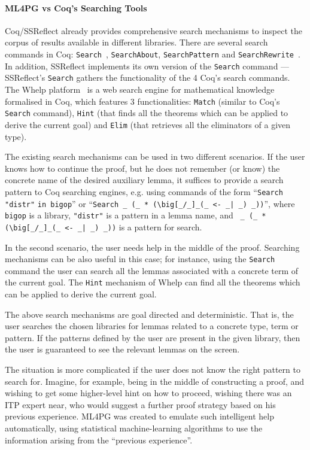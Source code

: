 \paragraph{ML4PG vs Coq's Searching Tools} Coq/SSReflect already provides comprehensive search mechanisms to inspect the corpus of results available in different libraries.
There are several search commands in Coq:  \lstinline?Search?~, \lstinline?SearchAbout?, \lstinline?SearchPattern?
and \lstinline?SearchRewrite?~\cite{Coq}. In addition, SSReflect implements its own version of the \lstinline?Search?
command \cite{SSReflect} --- SSReflect's \lstinline?Search? gathers the functionality of the 4 Coq's search commands.
The Whelp platform~\cite{AspertiGCTZ04} is a web search engine for mathematical knowledge formalised in Coq, which features 3 functionalities:
\lstinline?Match? (similar to Coq's \lstinline?Search? command), \lstinline?Hint? (that finds all the theorems which can
be applied to derive the current goal) and \lstinline?Elim? (that retrieves all the eliminators of a given type).

The existing search mechanisms can be used in two different scenarios. If the user knows how to continue the proof, but
he does not remember (or know) the concrete name of the desired auxiliary lemma, it suffices to provide a search pattern to Coq searching engines, e.g.
using commands of the form
``\lstinline?Search "distr"? \lstinline?in bigop?'' or
``\lstinline?Search _ (_ * (\big[_/_]_(_ <- _| _) _))?'',
 where \texttt{bigop} is a library, \texttt{"distr"} is a pattern in a lemma name, and  \lstinline? _ (_ * (\big[_/_]_(_ <- _| _) _))?
is a pattern for search.

In the second scenario, the user needs help in the middle of the proof. Searching mechanisms can be also useful in this
case; for instance, using the \lstinline?Search? command the user can search all the lemmas associated with a concrete term
of the current goal. The \lstinline?Hint? mechanism of Whelp can find all the theorems which can be applied to derive the current goal.

The above search mechanisms are goal directed and deterministic. That is, the user
searches  the chosen  libraries for lemmas related to a concrete type, term or pattern.
If the patterns defined by the user are present in the given library, then the user is guaranteed to see the relevant lemmas on the screen.

The situation is more complicated if the user does not know the right pattern to search for. Imagine, for example, being in the middle of constructing a proof,
and wishing to get some higher-level hint on how to proceed, wishing there was an ITP expert near, who would suggest a further proof strategy based on his previous experience. ML4PG was created to emulate such intelligent help automatically, using statistical machine-learning algorithms to use the information arising from the ``previous experience''.

